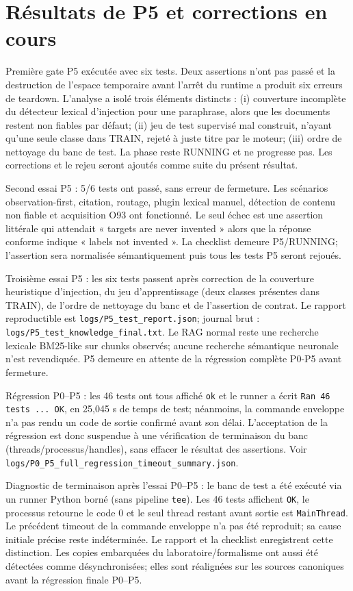 \documentclass[11pt,a4paper,oneside]{report}
\begin{document}
\section{Résultats de P5 et corrections en cours}
Première gate P5 exécutée avec six tests. Deux assertions n’ont pas passé et la destruction de l’espace temporaire avant l’arrêt du runtime a produit six erreurs de teardown. L’analyse a isolé trois éléments distincts : (i) couverture incomplète du détecteur lexical d’injection pour une paraphrase, alors que les documents restent non fiables par défaut; (ii) jeu de test supervisé mal construit, n’ayant qu’une seule classe dans TRAIN, rejeté à juste titre par le moteur; (iii) ordre de nettoyage du banc de test. La phase reste RUNNING et ne progresse pas. Les corrections et le rejeu seront ajoutés comme suite du présent résultat.


Second essai P5 : 5/6 tests ont passé, sans erreur de fermeture. Les scénarios observation-first, citation, routage, plugin lexical manuel, détection de contenu non fiable et acquisition O93 ont fonctionné. Le seul échec est une assertion littérale qui attendait « targets are never invented » alors que la réponse conforme indique « labels not invented ». La checklist demeure P5/RUNNING; l’assertion sera normalisée sémantiquement puis tous les tests P5 seront rejoués.


Troisième essai P5 : les six tests passent après correction de la couverture heuristique d’injection, du jeu d’apprentissage (deux classes présentes dans TRAIN), de l’ordre de nettoyage du banc et de l’assertion de contrat. Le rapport reproductible est \texttt{logs/P5\_test\_report.json}; journal brut : \texttt{logs/P5\_test\_knowledge\_final.txt}. Le RAG normal reste une recherche lexicale BM25-like sur chunks observés; aucune recherche sémantique neuronale n’est revendiquée. P5 demeure en attente de la régression complète P0-P5 avant fermeture.


Régression P0–P5 : les 46 tests ont tous affiché \texttt{ok} et le runner a écrit \texttt{Ran 46 tests ... OK}, en 25,045 s de temps de test; néanmoins, la commande enveloppe n’a pas rendu un code de sortie confirmé avant son délai. L’acceptation de la régression est donc suspendue à une vérification de terminaison du banc (threads/processus/handles), sans effacer le résultat des assertions. Voir \texttt{logs/P0\_P5\_full\_regression\_timeout\_summary.json}.


Diagnostic de terminaison après l’essai P0–P5 : le banc de test a été exécuté via un runner Python borné (sans pipeline \texttt{tee}). Les 46 tests affichent \texttt{OK}, le processus retourne le code 0 et le seul thread restant avant sortie est \texttt{MainThread}. Le précédent timeout de la commande enveloppe n’a pas été reproduit; sa cause initiale précise reste indéterminée. Le rapport et la checklist enregistrent cette distinction. Les copies embarquées du laboratoire/formalisme ont aussi été détectées comme désynchronisées; elles sont réalignées sur les sources canoniques avant la régression finale P0–P5.
\end{document}
